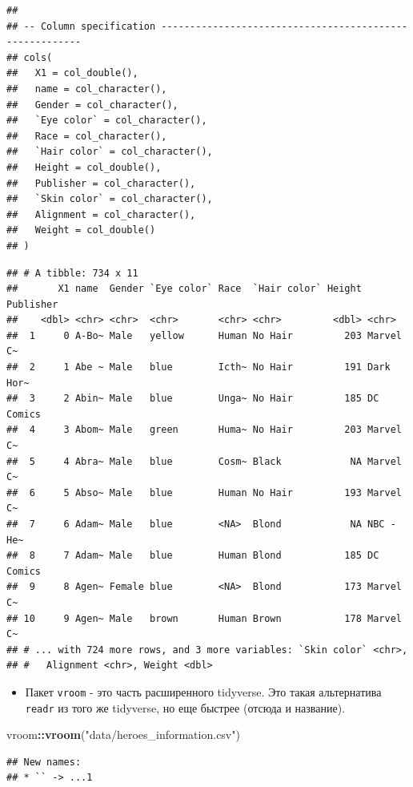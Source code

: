 \documentclass[]{book}
\newenvironment{Shaded}{\begin{snugshade}}{\end{snugshade}}
\newcommand{\KeywordTok}[1]{\textcolor[rgb]{0.13,0.29,0.53}{\textbf{#1}}}
\newcommand{\StringTok}[1]{\textcolor[rgb]{0.31,0.60,0.02}{#1}}
\newcommand{\OperatorTok}[1]{\textcolor[rgb]{0.81,0.36,0.00}{\textbf{#1}}}
\newcommand{\NormalTok}[1]{#1}
\providecommand{\tightlist}{%
  \setlength{\itemsep}{0pt}\setlength{\parskip}{0pt}}
\begin{document}
\begin{verbatim}
## 
## -- Column specification --------------------------------------------------------
## cols(
##   X1 = col_double(),
##   name = col_character(),
##   Gender = col_character(),
##   `Eye color` = col_character(),
##   Race = col_character(),
##   `Hair color` = col_character(),
##   Height = col_double(),
##   Publisher = col_character(),
##   `Skin color` = col_character(),
##   Alignment = col_character(),
##   Weight = col_double()
## )
\end{verbatim}

\begin{verbatim}
## # A tibble: 734 x 11
##       X1 name  Gender `Eye color` Race  `Hair color` Height Publisher
##    <dbl> <chr> <chr>  <chr>       <chr> <chr>         <dbl> <chr>    
##  1     0 A-Bo~ Male   yellow      Human No Hair         203 Marvel C~
##  2     1 Abe ~ Male   blue        Icth~ No Hair         191 Dark Hor~
##  3     2 Abin~ Male   blue        Unga~ No Hair         185 DC Comics
##  4     3 Abom~ Male   green       Huma~ No Hair         203 Marvel C~
##  5     4 Abra~ Male   blue        Cosm~ Black            NA Marvel C~
##  6     5 Abso~ Male   blue        Human No Hair         193 Marvel C~
##  7     6 Adam~ Male   blue        <NA>  Blond            NA NBC - He~
##  8     7 Adam~ Male   blue        Human Blond           185 DC Comics
##  9     8 Agen~ Female blue        <NA>  Blond           173 Marvel C~
## 10     9 Agen~ Male   brown       Human Brown           178 Marvel C~
## # ... with 724 more rows, and 3 more variables: `Skin color` <chr>,
## #   Alignment <chr>, Weight <dbl>
\end{verbatim}

\begin{itemize}
\tightlist
\item
  Пакет \texttt{vroom} - это часть расширенного tidyverse. Это такая
  альтернатива \texttt{readr} из того же tidyverse, но еще быстрее
  (отсюда и название).
\end{itemize}

\begin{Shaded}
\begin{Highlighting}[]
\NormalTok{vroom}\OperatorTok{::}\KeywordTok{vroom}\NormalTok{(}\StringTok{"data/heroes_information.csv"}\NormalTok{)}
\end{Highlighting}
\end{Shaded}

\begin{verbatim}
## New names:
## * `` -> ...1
\end{verbatim}
\end{document}
